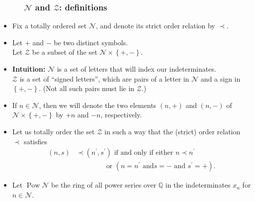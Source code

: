 \documentclass{beamer}
\newcommand{\calN}{\mathcal{N}}
\newcommand{\calZ}{\mathcal{Z}}
\newcommand{\fti}[1]{\frametitle{\ \ \ \ \ #1}}
\newcommand{\set}[1]{\left\{ #1 \right\}}
\newcommand{\defn}[1]{{\color{darkred}\emph{#1}}} %
\theoremstyle{plain}
\begin{document}
\begin{frame}
\fti{$\calN$ and $\calZ$: definitions}

\begin{itemize}

\item Fix a totally ordered set \defn{$\mathcal{N}$}, and denote its strict order
relation by \defn{$\prec$}.

\item Let \defn{$+$} and \defn{$-$} be two distinct symbols. \\
Let \defn{$\mathcal{Z}$} be a subset of the set $\mathcal{N}\times\left\{  +,-\right\}
$.

\item \textbf{Intuition:} $\calN$ is a set of letters that will index our
      indeterminates. \\
      $\calZ$ is a set of ``signed letters'', which are pairs of a letter
      in $\calN$ and a sign in $\set{+,-}$.
      (Not all such pairs must lie in $\calZ$.)

\pause


\item If $n\in\mathcal{N}$,
then we will denote the two elements $\left(  n,+\right)  $ and $\left(
n,-\right)  $ of $\mathcal{N}\times\left\{  +,-\right\}  $ by \defn{$+n$} and \defn{$-n$}, respectively.

\pause

\item Let us totally order the set $\mathcal{Z}$ in such a way that the (strict)
order relation $\prec$ satisfies%
\begin{align*}
\left(  n,s\right)  &\prec\left(  n^{\prime},s^{\prime}\right)  \text{ if and
only if either }n\prec n^{\prime} \\
& \qquad \qquad \text{ or }\left(  n=n^{\prime}\text{ and
}s=-\text{ and }s^{\prime}=+\right)  .
\end{align*}

\pause

\item Let $\operatorname*{Pow}\mathcal{N}$ be the ring of all power series over
$\mathbb{Q}$ in the indeterminates $x_{n}$ for $n\in\mathcal{N}$.

\end{itemize}

\end{frame}
\end{document}
